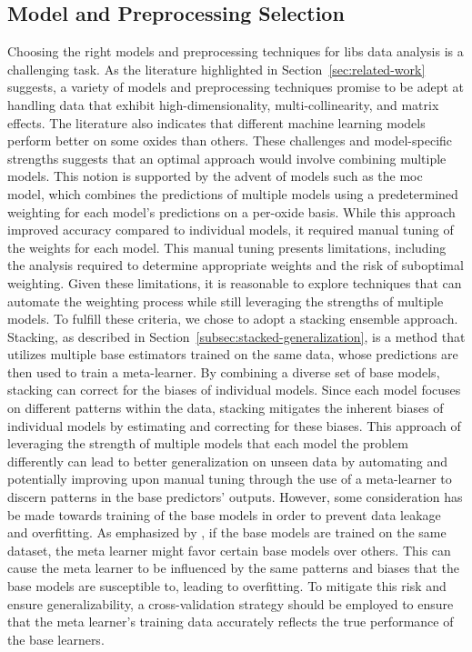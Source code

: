\subsection{Model and Preprocessing Selection}

Choosing the right models and preprocessing techniques for \gls{libs} data analysis is a challenging task. 
As the literature highlighted in Section~\ref{sec:related-work} suggests, a variety of models and preprocessing techniques promise to be adept at handling data that exhibit high-dimensionality, multi-collinearity, and matrix effects.
The literature also indicates that different machine learning models perform better on some oxides than others.
These challenges and model-specific strengths suggests that an optimal approach would involve combining multiple models. 
This notion is supported by the advent of models such as the \gls{moc}~\cite{cleggRecalibrationMarsScience2017} model, which combines the predictions of multiple models using a predetermined weighting for each model's predictions on a per-oxide basis.
While this approach improved accuracy compared to individual models, it required manual tuning of the weights for each model.
This manual tuning presents limitations, including the analysis required to determine appropriate weights and the risk of suboptimal weighting.
Given these limitations, it is reasonable to explore techniques that can automate the weighting process while still leveraging the strengths of multiple models.
To fulfill these criteria, we chose to adopt a stacking ensemble approach. 
Stacking, as described in Section~\ref{subsec:stacked-generalization}, is a method that utilizes multiple base estimators trained on the same data, whose predictions are then used to train a meta-learner.
By combining a diverse set of base models, stacking can correct for the biases of individual models.
Since each model focuses on different patterns within the data, stacking mitigates the inherent biases of individual models by estimating and correcting for these biases.
This approach of leveraging the strength of multiple models that each model the problem differently can lead to better generalization on unseen data by automating and potentially improving upon manual tuning through the use of a meta-learner to discern patterns in the base predictors' outputs. \cite{wolpertstacked_1992} \cite{survey_of_ensemble_learning}
However, some consideration has be made towards training of the base models in order to prevent data leakage and overfitting.
As emphasized by \citet{cvstacking}, if the base models are trained on the same dataset, the meta learner might favor certain base models over others.
This can cause the meta learner to be influenced by the same patterns and biases that the base models are susceptible to, leading to overfitting.
To mitigate this risk and ensure generalizability, a cross-validation strategy should be employed to ensure that the meta learner's training data accurately reflects the true performance of the base learners.

